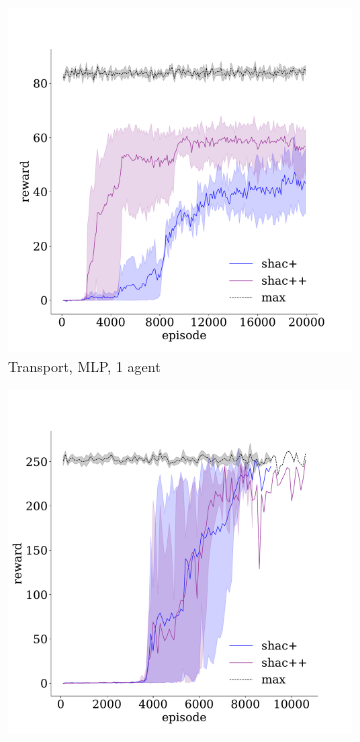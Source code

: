 \begin{figure}[!t]
    \begin{subfigure}[b]{0.30\textwidth}
        \includegraphics[width=\textwidth]{figs/transport-ablation-1-mlp.pdf}
        \caption{Transport, MLP, 1 agent}
        \label{fig:transport-ablation-mlp-1}
    \end{subfigure}
    \begin{subfigure}[b]{0.30\textwidth}
        \includegraphics[width=\textwidth]{figs/transport-ablation-3-transformer.pdf}

\end{subfigure}
\end{figure}
